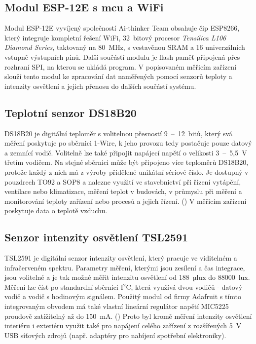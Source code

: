     \subsection{Modul ESP-12E s \acrshort{mcu} a WiFi}
        Modul ESP-12E vyvíjený společností Ai-thinker Team obsahuje čip ESP8266, který integruje kompletní řešení WiFi, 32~bitový procesor \emph{Tensilica L106 Diamond Series}, taktovaný na 80~MHz, s vestavěnou SRAM a 16 univerzálních vstupně-výstupních pinů. Další součástí modulu je flash paměť připojená přes rozhraní SPI, na kterou se ukládá program. \cite{ai-thinker:esp12e} V popisovaném měřicím zařízení slouží tento modul ke zpracování dat naměřených pomocí senzorů teploty a intenzity osvětlení a jejich přenosu do dalších součástí systému.
    \subsection{Teplotní senzor DS18B20}
        DS18B20 je digitální teploměr s volitelnou přesností 9~--~12~bitů, který svá měření poskytuje po sběrnici 1-Wire, k jeho provozu tedy postačuje pouze datový a zemnící vodič. Volitelně lze také připojit napájecí napětí o velikosti 3~--~5{,}5~V třetím vodičem. Na stejné sběrnici může být připojeno více teploměrů DS18B20, protože každý z nich má z výroby přidělené unikátní sériové číslo. Je dostupný v pouzdrech TO92 a SOP8 a nalezne využití ve stavebnictví při řízení vytápění, ventilace nebo klimatizace, měření teplot v budovách, v průmyslu při měření a monitorování teploty zařízení nebo procesů a jejich řízení. (\cite{dallas:ds18b20}) V měřicím zařízení poskytuje data o teplotě vzduchu.
    \subsection{Senzor intenzity osvětlení TSL2591}
        TSL2591 je digitální senzor intenzity osvětlení, který pracuje ve viditelném a infračerveném spektru. Parametry měření, kterými jsou zesílení a čas integrace, jsou volitelné a je tak možné měřit intenzitu osvětlení od 188~µlux do $88000$~lux. Měření lze číst po standardní sběrnici I$^2$C, která využívá dvou vodičů - datový vodič a vodič s hodinovým signálem. Použitý modul od firmy Adafruit s tímto integrovaným obvodem má také vlastní lineární regulátor napětí MIC5225 proudově zatížitelný až do 150~mA. (\cite{adafruit:tsl2591}) Proto byl kromě měření intenzity osvětlení interiéru i exteriéru využit také pro napájení celého zařízení z rozšířených 5~V USB síťových zdrojů (např. adaptéry pro nabíjení spotřební elektroniky).
